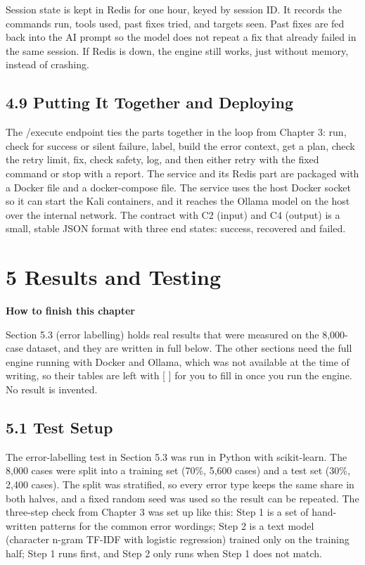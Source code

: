 \documentclass[
]{article}
\begin{document}
Session state is kept in Redis for one hour, keyed by session ID. It
records the commands run, tools used, past fixes tried, and targets
seen. Past fixes are fed back into the AI prompt so the model does not
repeat a fix that already failed in the same session. If Redis is down,
the engine still works, just without memory, instead of crashing.

\hypertarget{putting-it-together-and-deploying}{%
\subsection{4.9 Putting It Together and
Deploying}\label{putting-it-together-and-deploying}}

The /execute endpoint ties the parts together in the loop from Chapter
3: run, check for success or silent failure, label, build the error
context, get a plan, check the retry limit, fix, check safety, log, and
then either retry with the fixed command or stop with a report. The
service and its Redis part are packaged with a Docker file and a
docker-compose file. The service uses the host Docker socket so it can
start the Kali containers, and it reaches the Ollama model on the host
over the internal network. The contract with C2 (input) and C4 (output)
is a small, stable JSON format with three end states: success, recovered
and failed.

\hypertarget{results-and-testing}{%
\section{5 Results and Testing}\label{results-and-testing}}

\textbf{How to finish this chapter}

Section 5.3 (error labelling) holds real results that were measured on
the 8,000-case dataset, and they are written in full below. The other
sections need the full engine running with Docker and Ollama, which was
not available at the time of writing, so their tables are left with {[}
{]} for you to fill in once you run the engine. No result is invented.

\hypertarget{test-setup}{%
\subsection{5.1 Test Setup}\label{test-setup}}

The error-labelling test in Section 5.3 was run in Python with
scikit-learn. The 8,000 cases were split into a training set (70\%,
5,600 cases) and a test set (30\%, 2,400 cases). The split was
stratified, so every error type keeps the same share in both halves, and
a fixed random seed was used so the result can be repeated. The
three-step check from Chapter 3 was set up like this: Step 1 is a set of
hand-written patterns for the common error wordings; Step 2 is a text
model (character n-gram TF-IDF with logistic regression) trained only on
the training half; Step 1 runs first, and Step 2 only runs when Step 1
does not match.
\end{document}
